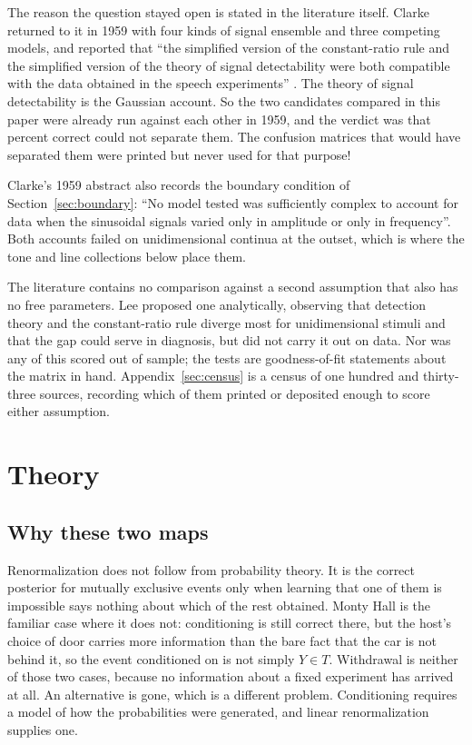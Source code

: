 \documentclass[11pt]{article}
\begin{document}
The reason the question stayed open is stated in the literature itself. Clarke returned to it in
1959 with four kinds of signal ensemble and three competing models, and reported that ``the
simplified version of the constant-ratio rule and the simplified version of the theory of signal
detectability were both compatible with the data obtained in the speech experiments''
\cite{clarke1959}. The theory of signal detectability is the Gaussian account. So the two
candidates compared in this paper were already run against each other in 1959, and the verdict
was that percent correct could not separate them. The confusion matrices that would have
separated them were printed but never used for that purpose!

Clarke's 1959 abstract also records the boundary condition of
Section~\ref{sec:boundary}: ``No model tested was sufficiently
complex to account for data when the sinusoidal signals varied only in amplitude or only in
frequency''. Both accounts failed on unidimensional continua at the outset, which is where the
tone and line collections below place them.

The literature contains no comparison against a second assumption that also has no free
parameters. Lee \cite{lee1968} proposed one analytically, observing that detection
theory and the constant-ratio rule diverge most for unidimensional stimuli and that the gap
could serve in diagnosis, but did not carry it out on data. Nor was any of this scored out of
sample; the tests are goodness-of-fit statements about the matrix in hand.
Appendix~\ref{sec:census} is a census of one hundred and thirty-three sources, recording which of them printed
or deposited enough to score either assumption.

\section{Theory}
\label{sec:theory}

\subsection{Why these two maps}
\label{sec:maps}

Renormalization does not follow from probability theory. It is the correct posterior for
mutually exclusive events only when learning that one of them is impossible says nothing about
which of the rest obtained. Monty Hall is the familiar case where it does not: conditioning is
still correct there, but the host's choice of door carries more information than the bare fact
that the car is not behind it, so the event conditioned on is not simply $Y \in T$. Withdrawal is
neither of those two cases, because no information about a fixed experiment has arrived at all.
An alternative is gone, which is a different problem.
Conditioning requires a model of how the probabilities were generated, and linear renormalization supplies one.
\end{document}
